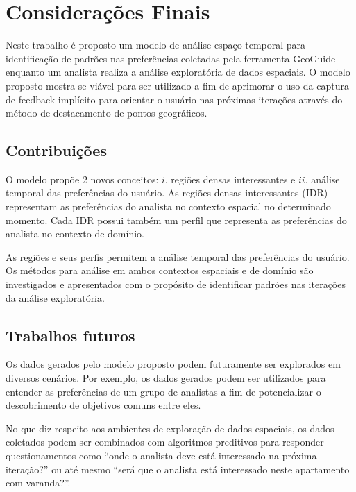 \chapter{Considerações Finais}
\label{chap:conclusao}

Neste trabalho é proposto um modelo de análise espaço-temporal para identificação de padrões nas preferências coletadas pela ferramenta GeoGuide enquanto um analista realiza a análise exploratória de dados espaciais. O modelo proposto mostra-se viável para ser utilizado a fim de aprimorar o uso da captura de feedback implícito para orientar o usuário nas próximas iterações através do método de destacamento de pontos geográficos.

\section{Contribuições}

O modelo propõe 2 novos conceitos: $i$. regiões densas interessantes e $ii$. análise temporal das preferências do usuário. As regiões densas interessantes (IDR) representam as preferências do analista no contexto espacial no determinado momento. Cada IDR possui também um perfil que representa as preferências do analista no contexto de domínio.

As regiões e seus perfis permitem a análise temporal das preferências do usuário. Os métodos para análise em ambos contextos espaciais e de domínio são investigados e apresentados com o propósito de identificar padrões nas iterações da análise exploratória.

\section{Trabalhos futuros}

Os dados gerados pelo modelo proposto podem futuramente ser explorados em diversos cenários. Por exemplo, os dados gerados podem ser utilizados para entender as preferências de um grupo de analistas a fim de potencializar o descobrimento de objetivos comuns entre eles.

No que diz respeito aos ambientes de exploração de dados espaciais, os dados coletados podem ser combinados com algoritmos preditivos para responder questionamentos como ``onde o analista deve está interessado na próxima iteração?'' ou até mesmo ``será que o analista está interessado neste apartamento com varanda?''.  